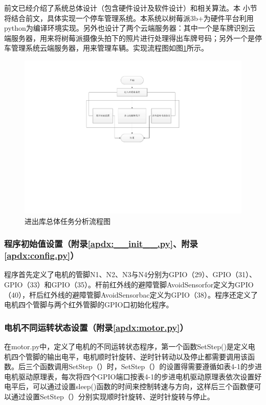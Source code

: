 前文已经介绍了系统总体设计（包含硬件设计及软件设计）和相关算法。本
小节将结合前文，具体实现一个停车管理系统。本系统以树莓派3b+为硬件平台利用python为编译环境实现。另外也设计了两个云端服务器：其中一个是车牌识别云端服务器，用来将树莓派摄像头拍下的照片进行处理得出车牌号码；另外一个是停车管理系统云端服务器，用来管理车辆。实现流程图如图\ref{fig:进出库总体任务分析流程图}所示。

\begin{figure}[htbp]
	\centering
	\includegraphics[width=\textwidth]{figure/software-7.pdf}
	\caption{进出库总体任务分析流程图}\label{fig:进出库总体任务分析流程图}
\end{figure}

\subsubsection{程序初始值设置（附录\ref{apdx:__init__.py}、附录\ref{apdx:config.py}）}
程序首先定义了电机的管脚N1、N2、N3与N4分别为GPIO（29）、GPIO（31）、GPIO（33）和GPIO（35）。杆前红外线的避障管脚AvoidSensorfor定义为GPIO（40），杆后红外线的避障管脚AvoidSensorbac定义为GPIO（38）。程序还定义了电机四个管脚与两个红外管脚的GPIO口初始化程序。

\subsubsection{电机不同运转状态设置（附录\ref{apdx:motor.py}）}
在motor.py中，定义了电机的不同运转状态程序，第一个函数SetStep()是定义电机四个管脚的输出电平，电机顺时针旋转、逆时针转动以及停止都需要调用该函数。后三个函数调用SetStep（）时，SetStep（）的设置得需要遵循如表4-1的步进电机驱动原理表，每次将四个GPIO端口按表4-1的步进电机驱动原理表依次设置好电平后，可以通过设置sleep()函数的时间来控制转速与方向，这样后三个函数便可以通过设置SetStep（）分别实现顺时针旋转、逆时针旋转与停止。

